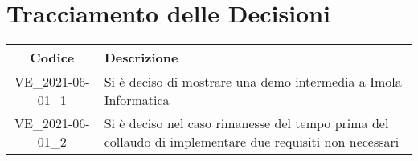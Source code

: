 \section*{Tracciamento delle Decisioni}

\begin{center}
	\begin{longtable}{|c|p{13cm}|}
	\hline
	\rowcolor{lighter-grayer}
	\textbf{Codice} & \textbf{Descrizione} \\
	\hline
	\endfirsthead

	\hline
	VE\_2021-06-01\_1 & Si è deciso di mostrare una demo intermedia a Imola Informatica \\	
	VE\_2021-06-01\_2 & Si è deciso nel caso rimanesse del tempo prima del collaudo di implementare due requisiti non necessari \\			
	\hline

	\end{longtable}
\end{center}